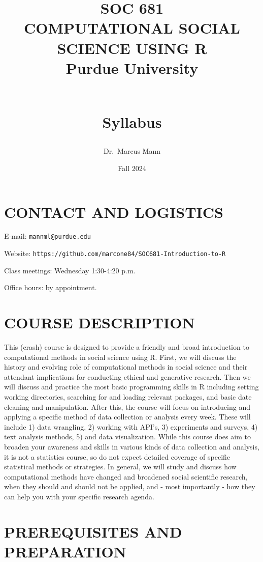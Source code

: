 \documentclass[
  10pt,
]{article}
\title{SOC 681\\
COMPUTATIONAL SOCIAL SCIENCE USING R\\
Purdue University\\
\strut \\
\hspace*{0.333em}Syllabus}
\author{Dr.~Marcus Mann}
\date{Fall 2024}
\begin{document}
\maketitle

\hypertarget{contact-and-logistics}{%
\section{CONTACT AND LOGISTICS}\label{contact-and-logistics}}

E-mail: \texttt{mannml@purdue.edu}

Website: \texttt{https://github.com/marcone84/SOC681-Introduction-to-R}

Class meetings: Wednesday 1:30-4:20 p.m.

Office hours: by appointment.

\hypertarget{course-description}{%
\section{COURSE DESCRIPTION}\label{course-description}}

This (crash) course is designed to provide a friendly and broad
introduction to computational methods in social science using R. First,
we will discuss the history and evolving role of computational methods
in social science and their attendant implications for conducting
ethical and generative research. Then we will discuss and practice the
most basic programming skills in R including setting working
directories, searching for and loading relevant packages, and basic date
cleaning and manipulation. After this, the course will focus on
introducing and applying a specific method of data collection or
analysis every week. These will include 1) data wrangling, 2) working
with API's, 3) experiments and surveys, 4) text analysis methods, 5) and
data visualization. While this course does aim to broaden your awareness
and skills in various kinds of data collection and analysis, it is not a
statistics course, so do not expect detailed coverage of specific
statistical methods or strategies. In general, we will study and discuss
how computational methods have changed and broadened social scientific
research, when they should and should not be applied, and - most
importantly - how they can help you with your specific research agenda.

\hypertarget{prerequisites-and-preparation}{%
\section{PREREQUISITES AND
PREPARATION}\label{prerequisites-and-preparation}}
\end{document}
